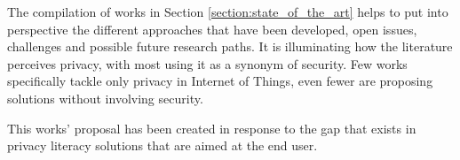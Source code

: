 The compilation of works in Section \ref{section:state_of_the_art} helps
to put into perspective the different approaches that have been developed,
open issues, challenges and possible future research paths. It is illuminating
how the literature perceives privacy, with most using it as a synonym of security.
Few works specifically tackle only privacy in Internet of Things, even fewer
are proposing solutions without involving security.

This works' proposal has been created in response to the gap that exists
in privacy literacy solutions that are aimed at the end user.
